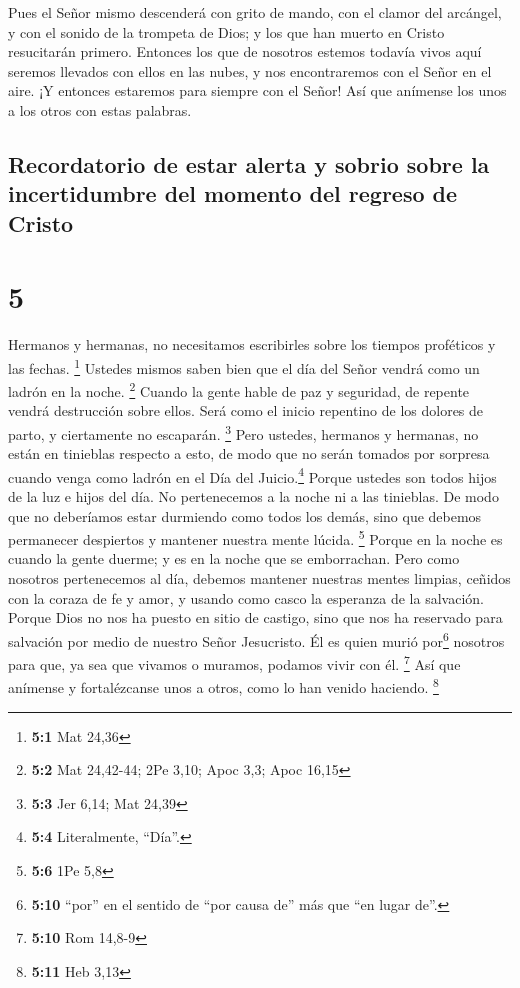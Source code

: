  Pues el Señor mismo descenderá con grito de mando, con
el clamor del arcángel, y con el sonido de la trompeta de Dios; y los
que han muerto en Cristo resucitarán primero.  Entonces
los que de nosotros estemos todavía vivos aquí seremos llevados con
ellos en las nubes, y nos encontraremos con el Señor en el aire. ¡Y
entonces estaremos para siempre con el Señor!  Así que
anímense los unos a los otros con estas palabras.

\hypertarget{recordatorio-de-estar-alerta-y-sobrio-sobre-la-incertidumbre-del-momento-del-regreso-de-cristo}{%
\subsection{Recordatorio de estar alerta y sobrio sobre la incertidumbre
del momento del regreso de
Cristo}\label{recordatorio-de-estar-alerta-y-sobrio-sobre-la-incertidumbre-del-momento-del-regreso-de-cristo}}

\hypertarget{section-4}{%
\section{5}\label{section-4}}

 Hermanos y hermanas, no necesitamos escribirles sobre los
tiempos proféticos y las fechas. \footnote{\textbf{5:1} Mat 24,36}
 Ustedes mismos saben bien que el día del Señor vendrá
como un ladrón en la noche. \footnote{\textbf{5:2} Mat 24,42-44; 2Pe
  3,10; Apoc 3,3; Apoc 16,15}  Cuando la gente hable de
paz y seguridad, de repente vendrá destrucción sobre ellos. Será como el
inicio repentino de los dolores de parto, y ciertamente no escaparán.
\footnote{\textbf{5:3} Jer 6,14; Mat 24,39}  Pero ustedes,
hermanos y hermanas, no están en tinieblas respecto a esto, de modo que
no serán tomados por sorpresa cuando venga como ladrón en el Día del
Juicio.\footnote{\textbf{5:4} Literalmente, ``Día''.} 
Porque ustedes son todos hijos de la luz e hijos del día. No
pertenecemos a la noche ni a las tinieblas.  De modo que
no deberíamos estar durmiendo como todos los demás, sino que debemos
permanecer despiertos y mantener nuestra mente lúcida. \footnote{\textbf{5:6}
  1Pe 5,8}  Porque en la noche es cuando la gente duerme;
y es en la noche que se emborrachan.  Pero como nosotros
pertenecemos al día, debemos mantener nuestras mentes limpias, ceñidos
con la coraza de fe y amor, y usando como casco la esperanza de la
salvación.  Porque Dios no nos ha puesto en sitio de
castigo, sino que nos ha reservado para salvación por medio de nuestro
Señor Jesucristo.  Él es quien murió por\footnote{\textbf{5:10}
  ``por'' en el sentido de ``por causa de'' más que ``en lugar de''.}
nosotros para que, ya sea que vivamos o muramos, podamos vivir con él.
\footnote{\textbf{5:10} Rom 14,8-9}  Así que anímense y
fortalézcanse unos a otros, como lo han venido haciendo. \footnote{\textbf{5:11}
  Heb 3,13}

